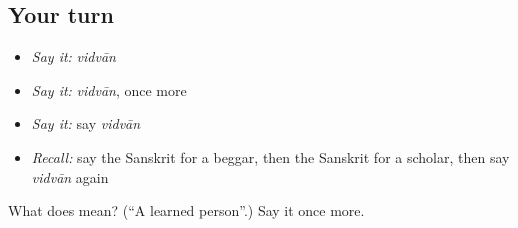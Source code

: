 \subsection*{Your turn}
\begin{itemize}
\raggedright
  \item \emph{Say it:} \emph{vidvān}
  \item \emph{Say it:} \emph{vidvān}, once more
  \item \emph{Say it:} say \emph{vidvān}
  \item \emph{Recall:} say the Sanskrit for a beggar, then the Sanskrit for a scholar, then say \emph{vidvān} again
\end{itemize}

\begin{tcolorbox}[breakable,colback=teal!4,colframe=teal!35!black,title={Before you move on}]
What does  mean? (\textquotedblleft{}A learned person\textquotedblright{}.) Say it once more.
\end{tcolorbox}
